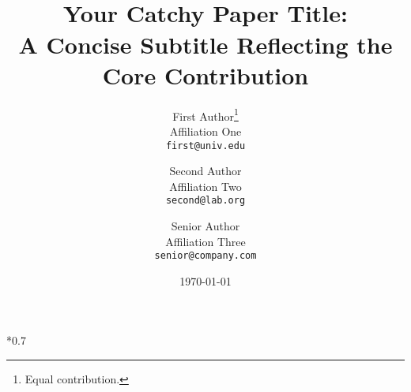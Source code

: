 {*0.7}

  \usepackage[dvipsnames]{xcolor}
  \usepackage{hyperref}
  \usepackage[capitalise,nameinlink]{cleveref}

  \usepackage{amsmath,amssymb,mathtools}

  \usepackage{graphicx}
  \usepackage{subcaption}
  \usepackage{booktabs}
  \usepackage{siunitx}
  \usepackage[labelfont=bf]{caption}
  \captionsetup{font=small}

  \usepackage{algorithm}
  \usepackage{algpseudocode} %
  \algrenewcommand{}

  \usepackage{enumitem}

  \usepackage{amsthm}
  \newtheorem{theorem}{Theorem}
  \newtheorem{lemma}{Lemma}
  \theoremstyle{definition}
  \newtheorem{definition}{Definition}
  \theoremstyle{remark}
  \newtheorem{remark}{Remark}

  \newcommand{\E}{\mathbb{E}}
  \newcommand{\Var}{\mathrm{Var}}
  \newcommand{\R}{\mathbb{R}}
  \newcommand{\todo}[1]{\textcolor{red}{[TODO: #1]}}

  \usepackage[numbers,sort&compress]{natbib}

  \title{\\[-0.8em]\textbf{Your Catchy Paper Title}:\\[0.25em]A Concise Subtitle Reflecting the Core Contribution\\[-0.3em]}
  \author{
    First Author\thanks{Equal contribution.}\\Affiliation One \\
    \texttt{first@univ.edu}
    \and
    Second Author\footnotemark[1]\\Affiliation Two \\
    \texttt{second@lab.org}
    \and
    Senior Author\\Affiliation Three \\
    \texttt{senior@company.com}
  }
  \date{\today}

